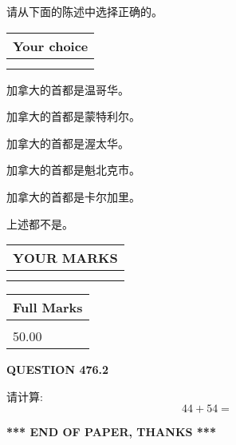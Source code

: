 \documentclass{ctexart}
\begin{document}
  
请从下面的陈述中选择正确的。
  
  
\noindent\hspace{3.0in} \begin{tabular}{|l|}
\hline
Your choice \\
\hline
 \\ 
 \\ 
\hline
\end{tabular}
  
  
 
 
加拿大的首都是温哥华。
 
 
加拿大的首都是蒙特利尔。
 
 
加拿大的首都是渥太华。
 
 
加拿大的首都是魁北克市。
 
 
加拿大的首都是卡尔加里。
 
 
 上述都不是。
 
 
  
\vspace{0.2in}
  
\noindent\begin{tabular}{|l|}
\hline
 YOUR MARKS  \\
\hline
 \\ 
 \\ 
\hline
\end{tabular}
\hspace{0.05in} \begin{tabular}{|l|}
\hline
 Full Marks  \\
\hline
 \\ 
50.00 \\
\hline
\end{tabular}
{\textbf{\Large{QUESTION
476.2 
}}}
  
  
 
请计算:
\begin{equation}
44 +  %
54 = \nonumber
\end{equation}
 

 

 
   
   
 \vspace{0.2in}
 
   
   
   
   
\vspace{1.0in} 
{\textbf{\large{ *** END OF PAPER, THANKS *** }}} 
   
\end{document}
